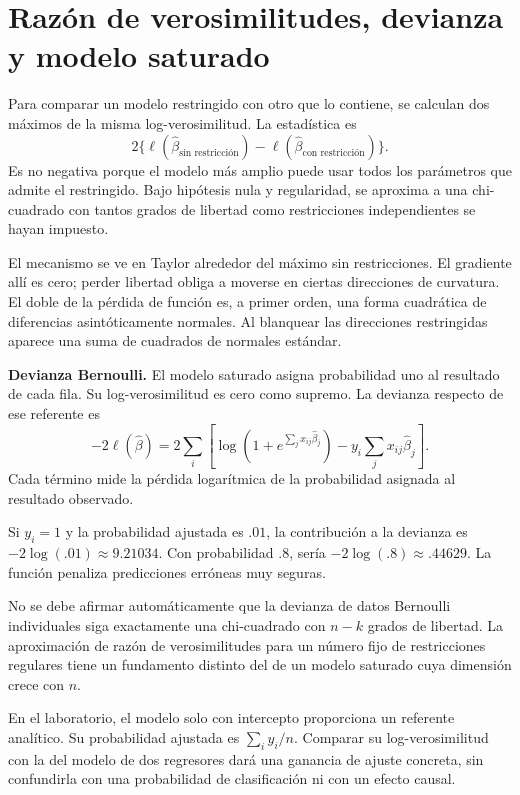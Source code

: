 \documentclass[11pt,a4paper]{article}
\begin{document}
\section{Razón de verosimilitudes, devianza y modelo saturado}\label{logit60}
Para comparar un modelo restringido con otro que lo contiene,
se calculan dos máximos de la misma log-verosimilitud.
La estadística es
\[
2\{\ell(\widehat\beta_{\text{sin restricción}})
-\ell(\widehat\beta_{\text{con restricción}})\}.
\]
Es no negativa porque el modelo más amplio puede usar
todos los parámetros que admite el restringido.
Bajo hipótesis nula y regularidad, se aproxima a una
chi-cuadrado con tantos grados de libertad como restricciones
independientes se hayan impuesto.

El mecanismo se ve en Taylor alrededor del máximo sin
restricciones. El gradiente allí es cero; perder libertad
obliga a moverse en ciertas direcciones de curvatura.
El doble de la pérdida de función es, a primer orden,
una forma cuadrática de diferencias asintóticamente normales.
Al blanquear las direcciones restringidas aparece una suma
de cuadrados de normales estándar.

\textbf{Devianza Bernoulli.}
El modelo saturado asigna probabilidad uno al resultado
de cada fila. Su log-verosimilitud es cero como supremo.
La devianza respecto de ese referente es
\[
-2\ell(\widehat\beta)
=
2\sum_i\left[
\log(1+e^{\sum_jx_{ij}\widehat\beta_j})
-y_i\sum_jx_{ij}\widehat\beta_j\right].
\]
Cada término mide la pérdida logarítmica de la probabilidad
asignada al resultado observado.

\begin{ejemplo}
Si $y_i=1$ y la probabilidad ajustada es $.01$,
la contribución a la devianza es $-2\log(.01)\approx9.21034$.
Con probabilidad $.8$, sería $-2\log(.8)\approx.44629$.
La función penaliza predicciones erróneas muy seguras.
\end{ejemplo}
No se debe afirmar automáticamente que la devianza de
datos Bernoulli individuales siga exactamente una
chi-cuadrado con $n-k$ grados de libertad.
La aproximación de razón de verosimilitudes para un número
fijo de restricciones regulares tiene un fundamento distinto
del de un modelo saturado cuya dimensión crece con $n$.

En el laboratorio, el modelo solo con intercepto
proporciona un referente analítico.
Su probabilidad ajustada es $\sum_i y_i/n$.
Comparar su log-verosimilitud con la del modelo de dos
regresores dará una ganancia de ajuste concreta,
sin confundirla con una probabilidad de clasificación
ni con un efecto causal.
\end{document}
